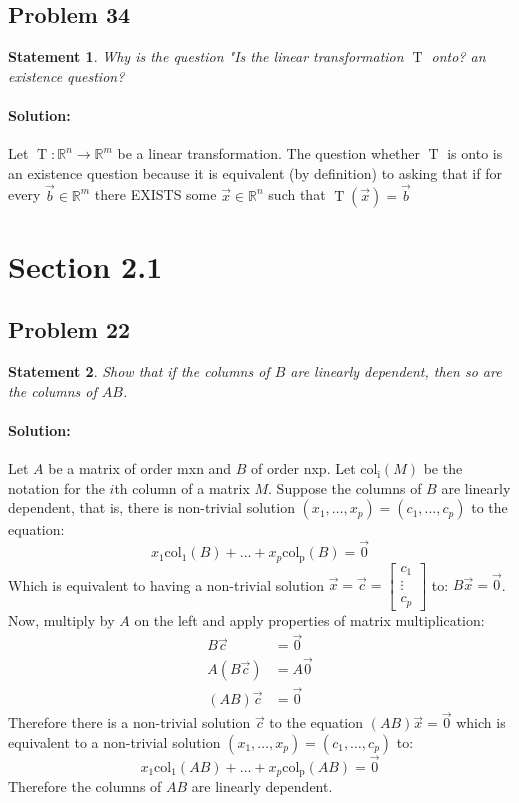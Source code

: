 \documentclass[12pt, letterpaper]{article}
\newcommand{\R}{\mathbb{R}}
\theoremstyle{statement}
\theoremstyle{statement}
\newtheorem*{atmStat}{Statement}
\newenvironment{Solution}{\noindent\ignorespaces\paragraph{Solution:}}{\hfill \ding{122}\par\noindent}
\begin{document}
    \subsection*{Problem 34}
    \begin{atmStat}
    Why is the question "Is the linear transformation $\operatorname{T}$ onto? an existence question?
    \end{atmStat}
    \begin{Solution}
    Let $\operatorname{T}:\R^n\longrightarrow\R^m$ be a linear transformation. The question whether $\operatorname{T}$ is onto is an existence question because it is equivalent (by definition) to asking that if for every $\Vec{b}\in\R^m$ there EXISTS some $\Vec{x}\in\R^n$ such that $\operatorname{T}(\Vec{x})=\Vec{b}$ 
    \end{Solution}
    
    \section*{Section 2.1}
    \subsection*{Problem 22}
    \begin{atmStat}
    Show that if the columns of $B$ are linearly dependent, then so are the columns of $AB$.
    \end{atmStat}
    \begin{Solution}
    Let $A$ be a matrix of order mxn and $B$ of order nxp. Let $\operatorname{col_i}(M)$ be the notation for the $i$th column of a matrix $M$. Suppose the columns of $B$ are linearly dependent, that is, there is non-trivial solution $(x_1, \dots, x_p)=(c_1, \dots, c_p)$ to the equation:
    $$
    x_1\operatorname{col_1}(B)+\dots+x_p\operatorname{col_p}(B)=\Vec{0}
    $$
    Which is equivalent to having a non-trivial solution $\Vec{x}=\Vec{c}=\begin{bmatrix}c_1 \\ \vdots \\ c_p\end{bmatrix}$ to: $B\Vec{x}=\Vec{0}$. Now, multiply by $A$ on the left and apply properties of matrix multiplication:
    \begin{align*}
         B\Vec{c} &= \Vec{0} \\
         A(B\Vec{c}) &= A\Vec{0} \\
         (AB)\Vec{c} &= \Vec{0} 
    \end{align*}
    Therefore there is a non-trivial solution $\Vec{c}$ to the equation $(AB)\Vec{x}=\Vec{0}$ which is equivalent to a non-trivial solution $(x_1,\dots,x_p)=(c_1,\dots,c_p)$ to: 
    $$
    x_1\operatorname{col_1}(AB)+\dots+x_p\operatorname{col_p}(AB)=\Vec{0}
    $$
   Therefore the columns of $AB$ are linearly dependent.
    \end{Solution}
    
\end{document}
